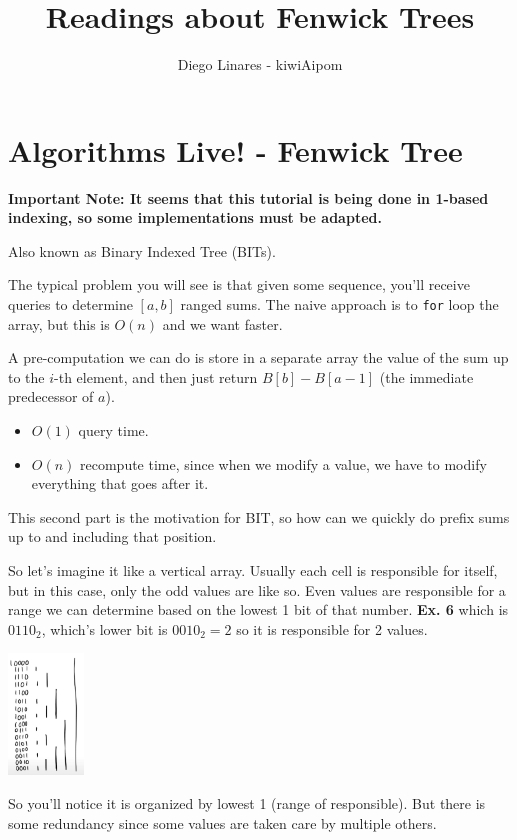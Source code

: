 \documentclass{IEEEtran}
\title{Readings about Fenwick Trees}
\author{Diego Linares - kiwiAipom}
\begin{document}
  \maketitle
  \section{Algorithms Live! - Fenwick Tree}
    \textbf{Important Note: It seems that this tutorial is being done in 1-based indexing, so some implementations must be adapted.}\par
    Also known as Binary Indexed Tree (BITs). \par
    The typical problem you will see is that given some sequence, you'll receive queries to determine $[a,b]$ ranged sums. The naive approach is to \texttt{for} loop the array, but this is $O(n)$ and we want faster.\par
    A pre-computation we can do is store in a separate array the value of the sum up to the $i$-th element, and then just return $B[b]-B[a-1]$ (the immediate predecessor of $a$).
    \begin{itemize}
      \item $O(1)$ query time.
      \item $O(n)$ recompute time, since when we modify a value, we have to modify everything that goes after it.
    \end{itemize}
    \par This second part is the motivation for BIT, so how can we quickly do prefix sums up to and including that position.\par
    So let's imagine it like a vertical array. Usually each cell is responsible for itself, but in this case, only the odd values are like so. Even values are responsible for a range we can determine based on the lowest 1 bit of that number. \textbf{Ex. 6} which is $0110_2$, which's lower bit is $0010_2 = 2$ so it is responsible for 2 values.
    \begin{center}
      \includegraphics[width=0.15\textwidth]{femwickTree.png}
    \end{center}
    So you'll notice it is organized by lowest 1 (range of responsible). But there is some redundancy since some values are taken care by multiple others. 
\end{document}
